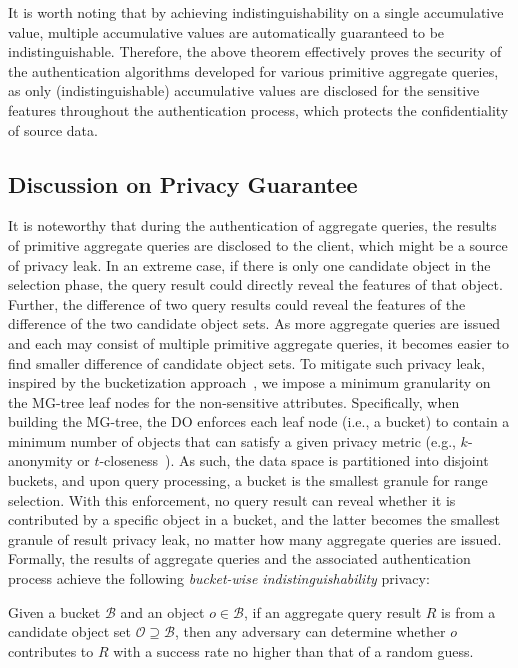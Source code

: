It is worth noting that by achieving indistinguishability on a single accumulative value, multiple accumulative values are automatically guaranteed to be indistinguishable.
Therefore, the above theorem effectively proves the security of the authentication algorithms developed for various primitive aggregate queries, as only (indistinguishable) accumulative values are disclosed for the sensitive features throughout the authentication process, which protects the confidentiality of source data.

\subsection{Discussion on Privacy Guarantee}
It is noteworthy that during the authentication of aggregate queries, the results of primitive aggregate queries are disclosed to the client, which might be a source of privacy leak. In an extreme case, if there is only one candidate object in the selection phase, the query result could directly reveal the features of that object. Further, the difference of two query results could reveal the features of the difference of the two candidate object sets. As more aggregate queries are issued and each may consist of multiple primitive aggregate queries, it becomes easier to find smaller difference of candidate object sets. To mitigate such privacy leak, inspired by the bucketization approach~\cite{ppdp09}, we impose a minimum granularity on the MG-tree leaf nodes for the non-sensitive attributes. Specifically, when building the MG-tree, the DO enforces each leaf node (i.e., a bucket) to contain a minimum number of objects that can satisfy a given privacy metric (e.g., $k$-anonymity or $t$-closeness~\cite{Samarati98, Li2007}). As such, the data space is partitioned into disjoint buckets, and upon query processing, a bucket is the smallest granule for range selection. With this enforcement, no query result can reveal whether it is contributed by a specific object in a bucket, and the latter becomes the smallest granule of result privacy leak, no matter how many aggregate queries are issued. Formally, the results of aggregate queries and the associated authentication process achieve the following \emph{bucket-wise indistinguishability} privacy:
\begin{definition}\label{def:aggregate-queries:k-anony}
  Given a bucket $\mathcal{B}$ and an object $o\in\mathcal{B}$, if an aggregate query result $R$ is from a candidate object set $\mathcal{O}\supseteq \mathcal{B}$, then any adversary can determine whether $o$ contributes to $R$ with a success rate no higher than that of a random guess.
\end{definition}

